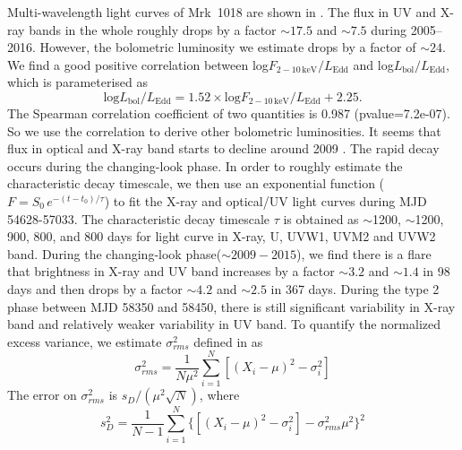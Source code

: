\documentclass[twocolumn]{aastex63}
\begin{document}
 
Multi-wavelength light curves of Mrk~1018 are shown in . The flux in UV and X-ray bands in the whole roughly drops by a factor $\sim17.5$ and $\sim7.5$ during 2005--2016. However, the bolometric luminosity we estimate drops by a factor of $\sim24$. We find a good positive correlation between log$F_\mathrm{2-10\,keV}/L_\mathrm{Edd}$ and log$L_\mathrm{bol}/L_\mathrm{Edd}$, which is parameterised as 
\begin{equation}\label{Lbol-LX}
\mathrm{log} L_\mathrm{bol}/L_\mathrm{Edd}= 1.52 \times \mathrm{log} F_\mathrm{2-10\,keV}/L_\mathrm{Edd}+2.25.
\end{equation} The Spearman correlation coefficient of two quantities is 0.987 (pvalue=7.2e-07). So we use the correlation to derive other bolometric luminosities. It seems that flux in optical and X-ray band starts to decline around 2009 \citep[see also the optical light curve in ][]{2016A&A...593L...8M}. The rapid decay occurs during the changing-look phase. In order to roughly estimate the characteristic decay timescale, we then use an exponential function ($F=S_0\,e^{-(t-t_0)/\tau }$) to fit the X-ray and optical/UV light curves during MJD 54628-57033. The characteristic decay timescale $\tau$ is obtained as $\sim$1200, $\sim$1200, 900, 800, and 800 days for light curve in X-ray, U, UVW1, UVM2 and UVW2 band. During the changing-look phase($\sim 2009-2015$), we find there is a flare that brightness in X-ray and UV band increases by a factor $\sim3.2$ and $\sim1.4$ in 98 days and then drops by a factor $\sim4.2$ and $\sim2.5$ in 367 days. During the type 2 phase between MJD 58350 and 58450, there is still significant variability in X-ray band and relatively weaker variability in UV band. To quantify the normalized excess variance, we estimate $\sigma^2_{rms} $ defined in \citet{1999ApJ...524..667T} as
\begin{equation}
\sigma^2_{rms}=\frac{1}{N\mu^2}\sum_{i=1}^{N}[(X_i-\mu)^2-\sigma_i^2]
\end{equation}
The error on $\sigma^2_{rms}$ is $s_D/(\mu^2\sqrt{N})$, where \begin{equation}
s_D^2=\frac{1}{N-1}\sum_{i=1}^{N}\{[(X_i-\mu)^2-\sigma_i^2]-\sigma^2_{rms}\mu^2\}^2
\end{equation}

\end{document}
